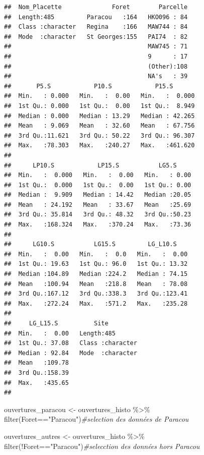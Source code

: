 \documentclass[
  12pt,
  american,
  a4paper,
  extrafontsizes,onecolumn,openright
  ]{memoir}
\newenvironment{Shaded}{\begin{snugshade}}{\end{snugshade}}
\newcommand{\CommentTok}[1]{\textcolor[rgb]{0.56,0.35,0.01}{\textit{#1}}}
\newcommand{\FunctionTok}[1]{\textcolor[rgb]{0.00,0.00,0.00}{#1}}
\newcommand{\NormalTok}[1]{#1}
\newcommand{\OtherTok}[1]{\textcolor[rgb]{0.56,0.35,0.01}{#1}}
\newcommand{\SpecialCharTok}[1]{\textcolor[rgb]{0.00,0.00,0.00}{#1}}
\newcommand{\StringTok}[1]{\textcolor[rgb]{0.31,0.60,0.02}{#1}}
\begin{document}
\begin{verbatim}
##  Nom_Placette              Foret        Parcelle  
##  Length:485         Paracou   :164   HKO096 : 84  
##  Class :character   Regina    :166   MAW744 : 84  
##  Mode  :character   St Georges:155   PAI74  : 82  
##                                      MAW745 : 71  
##                                      9      : 17  
##                                      (Other):108  
##                                      NA's   : 39  
##       P5.S            P10.S            P15.S        
##  Min.   : 0.000   Min.   :  0.00   Min.   :  0.000  
##  1st Qu.: 0.000   1st Qu.:  0.00   1st Qu.:  8.949  
##  Median : 0.000   Median : 13.29   Median : 42.265  
##  Mean   : 9.069   Mean   : 32.60   Mean   : 67.756  
##  3rd Qu.:11.621   3rd Qu.: 50.22   3rd Qu.: 96.307  
##  Max.   :78.303   Max.   :240.27   Max.   :461.620  
##                                                     
##      LP10.S            LP15.S           LG5.S      
##  Min.   :  0.000   Min.   :  0.00   Min.   : 0.00  
##  1st Qu.:  0.000   1st Qu.:  0.00   1st Qu.: 0.00  
##  Median :  9.909   Median : 14.42   Median :20.05  
##  Mean   : 24.192   Mean   : 33.67   Mean   :25.69  
##  3rd Qu.: 35.814   3rd Qu.: 48.32   3rd Qu.:50.23  
##  Max.   :168.324   Max.   :370.24   Max.   :73.36  
##                                                    
##      LG10.S           LG15.S         LG_L10.S     
##  Min.   :  0.00   Min.   :  0.0   Min.   :  0.00  
##  1st Qu.: 19.63   1st Qu.: 96.0   1st Qu.: 13.32  
##  Median :104.89   Median :224.2   Median : 74.15  
##  Mean   :100.94   Mean   :218.8   Mean   : 78.08  
##  3rd Qu.:167.12   3rd Qu.:338.3   3rd Qu.:123.41  
##  Max.   :272.24   Max.   :571.2   Max.   :235.28  
##                                                   
##     LG_L15.S          Site          
##  Min.   :  0.00   Length:485        
##  1st Qu.: 37.08   Class :character  
##  Median : 92.84   Mode  :character  
##  Mean   :109.78                     
##  3rd Qu.:158.39                     
##  Max.   :435.65                     
## 
\end{verbatim}

\begin{Shaded}
\begin{Highlighting}[]
\NormalTok{ouvertures\_paracou }\OtherTok{\textless{}{-}}\NormalTok{ ouvertures\_histo }\SpecialCharTok{\%\textgreater{}\%} 
  \FunctionTok{filter}\NormalTok{(Foret}\SpecialCharTok{==}\StringTok{"Paracou"}\NormalTok{)}\CommentTok{\#selection des données de Paracou}

\NormalTok{ouvertures\_autres }\OtherTok{\textless{}{-}}\NormalTok{ ouvertures\_histo }\SpecialCharTok{\%\textgreater{}\%} 
  \FunctionTok{filter}\NormalTok{(}\SpecialCharTok{!}\NormalTok{Foret}\SpecialCharTok{==}\StringTok{"Paracou"}\NormalTok{)}\CommentTok{\#selecction des données hors Paracou}
\end{Highlighting}
\end{Shaded}
\end{document}
